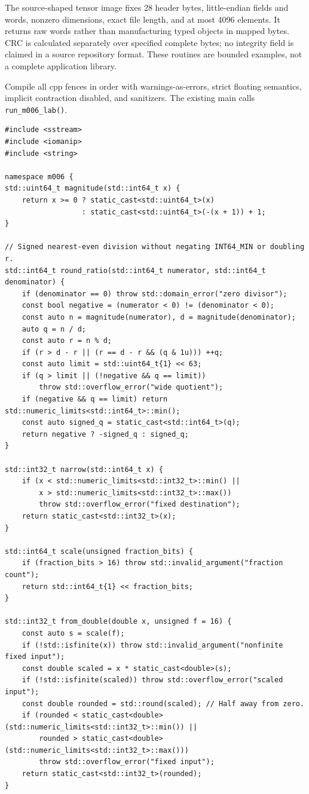 The source-shaped tensor image fixes 28 header bytes, little-endian fields and words, nonzero dimensions, exact file length, and at most 4096 elements. It returns raw words rather than manufacturing typed objects in mapped bytes. CRC is calculated separately over specified complete bytes; no integrity field is claimed in a source repository format. These routines are bounded examples, not a complete application library.

Compile all cpp fences in order with warnings-as-errors, strict floating semantics, implicit contraction disabled, and sanitizers. The existing main calls \texttt{run\_m006\_lab()}.

\begin{verbatim}
#include <sstream>
#include <iomanip>
#include <string>

namespace m006 {
std::uint64_t magnitude(std::int64_t x) {
    return x >= 0 ? static_cast<std::uint64_t>(x)
                  : static_cast<std::uint64_t>(-(x + 1)) + 1;
}

// Signed nearest-even division without negating INT64_MIN or doubling r.
std::int64_t round_ratio(std::int64_t numerator, std::int64_t denominator) {
    if (denominator == 0) throw std::domain_error("zero divisor");
    const bool negative = (numerator < 0) != (denominator < 0);
    const auto n = magnitude(numerator), d = magnitude(denominator);
    auto q = n / d;
    const auto r = n % d;
    if (r > d - r || (r == d - r && (q & 1u))) ++q;
    const auto limit = std::uint64_t{1} << 63;
    if (q > limit || (!negative && q == limit))
        throw std::overflow_error("wide quotient");
    if (negative && q == limit) return std::numeric_limits<std::int64_t>::min();
    const auto signed_q = static_cast<std::int64_t>(q);
    return negative ? -signed_q : signed_q;
}

std::int32_t narrow(std::int64_t x) {
    if (x < std::numeric_limits<std::int32_t>::min() ||
        x > std::numeric_limits<std::int32_t>::max())
        throw std::overflow_error("fixed destination");
    return static_cast<std::int32_t>(x);
}

std::int64_t scale(unsigned fraction_bits) {
    if (fraction_bits > 16) throw std::invalid_argument("fraction count");
    return std::int64_t{1} << fraction_bits;
}

std::int32_t from_double(double x, unsigned f = 16) {
    const auto s = scale(f);
    if (!std::isfinite(x)) throw std::invalid_argument("nonfinite fixed input");
    const double scaled = x * static_cast<double>(s);
    if (!std::isfinite(scaled)) throw std::overflow_error("scaled input");
    const double rounded = std::round(scaled); // Half away from zero.
    if (rounded < static_cast<double>(std::numeric_limits<std::int32_t>::min()) ||
        rounded > static_cast<double>(std::numeric_limits<std::int32_t>::max()))
        throw std::overflow_error("fixed input");
    return static_cast<std::int32_t>(rounded);
}


\end{verbatim}
